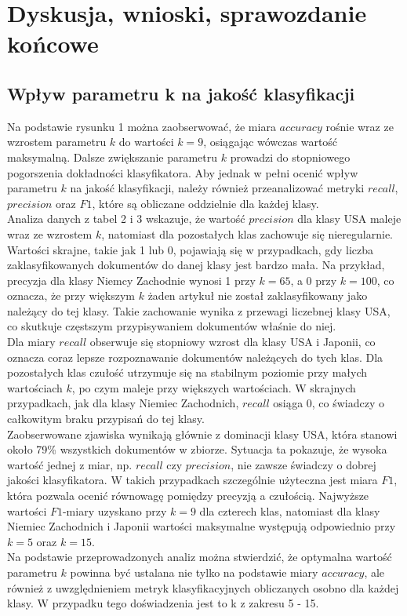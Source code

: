 \documentclass{article}
\begin{document}
\section{Dyskusja, wnioski, sprawozdanie końcowe}
\subsection{Wpływ parametru k na jakość klasyfikacji}
Na podstawie rysunku 1 można zaobserwować, że miara \(accuracy\) rośnie wraz ze wzrostem parametru \(k\) do wartości \(k = 9\), osiągając wówczas wartość maksymalną. Dalsze zwiększanie parametru \(k\) prowadzi do stopniowego pogorszenia dokładności klasyfikatora. Aby jednak w pełni ocenić wpływ parametru \(k\) na jakość klasyfikacji, należy również przeanalizować metryki \(recall\), \(precision\) oraz \(F1\), które są obliczane oddzielnie dla każdej klasy. \\
Analiza danych z tabel 2 i 3 wskazuje, że wartość \(precision\) dla klasy USA maleje wraz ze wzrostem \(k\), natomiast dla pozostałych klas zachowuje się nieregularnie. Wartości skrajne, takie jak 1 lub 0, pojawiają się w przypadkach, gdy liczba zaklasyfikowanych dokumentów do danej klasy jest bardzo mała. Na przykład, precyzja dla klasy Niemcy Zachodnie wynosi 1 przy \(k = 65\), a 0 przy \(k = 100\), co oznacza, że przy większym \(k\) żaden artykuł nie został zaklasyfikowany jako należący do tej klasy. Takie zachowanie wynika z przewagi liczebnej klasy USA, co skutkuje częstszym przypisywaniem dokumentów właśnie do niej. \\ 
Dla miary \(recall\) obserwuje się stopniowy wzrost dla klasy USA i Japonii, co oznacza coraz lepsze rozpoznawanie dokumentów należących do tych klas. Dla pozostałych klas czułość utrzymuje się na stabilnym poziomie przy małych wartościach \(k\), po czym maleje przy większych wartościach. W skrajnych przypadkach, jak dla klasy Niemiec Zachodnich, \(recall\) osiąga 0, co świadczy o całkowitym braku przypisań do tej klasy.\\
Zaobserwowane zjawiska wynikają głównie z dominacji klasy USA, która stanowi około 79\% wszystkich dokumentów w zbiorze. Sytuacja ta pokazuje, że wysoka wartość jednej z miar, np. \(recall\) czy \(precision\), nie zawsze świadczy o dobrej jakości klasyfikatora. W takich przypadkach szczególnie użyteczna jest miara \(F1\), która pozwala ocenić równowagę pomiędzy precyzją a czułością. Najwyższe wartości \(F1\)-miary uzyskano przy \(k = 9\) dla czterech klas, natomiast dla klasy Niemiec Zachodnich i Japonii wartości maksymalne występują odpowiednio przy \(k = 5\) oraz \(k = 15\). \\
Na podstawie przeprowadzonych analiz można stwierdzić, że optymalna wartość parametru \(k\) powinna być ustalana nie tylko na podstawie miary \(accuracy\), ale również z uwzględnieniem metryk klasyfikacyjnych obliczanych osobno dla każdej klasy. W przypadku tego doświadzenia jest to k z zakresu 5 - 15.
\end{document}
